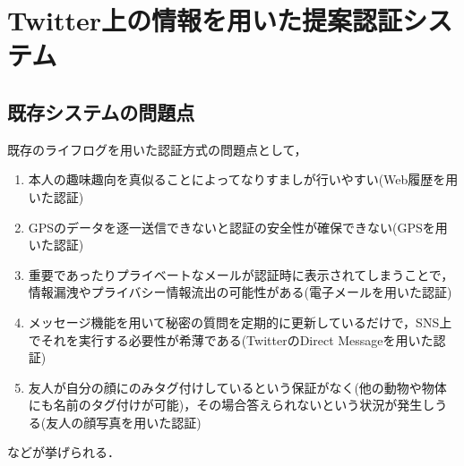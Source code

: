 \chapter{Twitter上の情報を用いた提案認証システム}\label{chap:system}
\section{既存システムの問題点}
既存のライフログを用いた認証方式の問題点として，
\begin{enumerate}
  \item 本人の趣味趣向を真似ることによってなりすましが行いやすい(Web履歴を用いた認証)
  \item GPSのデータを逐一送信できないと認証の安全性が確保できない(GPSを用いた認証)
  \item 重要であったりプライベートなメールが認証時に表示されてしまうことで，情報漏洩やプライバシー情報流出の可能性がある(電子メールを用いた認証)
  \item メッセージ機能を用いて秘密の質問を定期的に更新しているだけで，SNS上でそれを実行する必要性が希薄である(TwitterのDirect Messageを用いた認証)
  \item 友人が自分の顔にのみタグ付けしているという保証がなく(他の動物や物体にも名前のタグ付けが可能)，その場合答えられないという状況が発生しうる(友人の顔写真を用いた認証)
\end{enumerate}
などが挙げられる．

